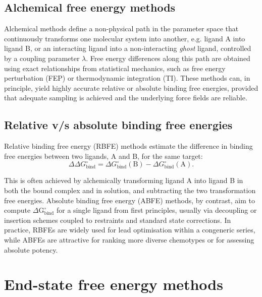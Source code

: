 \documentclass[12pt]{article}
\begin{document}
\subsection{Alchemical free energy methods}

Alchemical methods define a non-physical path in the parameter space that continuously transforms one molecular system into another, e.g. ligand A into ligand B, or an interacting ligand into a non-interacting \emph{ghost} ligand, controlled by a coupling parameter $\lambda$\cite{CH10_chipot2007free,CH10_choderamobley2011perspective}. Free energy differences along this path are obtained using exact relationships from statistical mechanics, such as free energy perturbation (FEP) or thermodynamic integration (TI). These methods can, in principle, yield highly accurate relative or absolute binding free energies, provided that adequate sampling is achieved and the underlying force fields are reliable. 

\subsection{Relative v/s absolute binding free energies}

Relative binding free energy (RBFE) methods estimate the difference in binding free energies between two ligands, A and B, for the same target:
\begin{equation}
\Delta\Delta G^\circ_\mathrm{bind} = \Delta G^\circ_\mathrm{bind}(\mathrm{B}) - \Delta G^\circ_\mathrm{bind}(\mathrm{A}). 
\end{equation}

This is often achieved by alchemically transforming ligand A into ligand B in both the bound complex and in solution, and subtracting the two transformation free energies. Absolute binding free energy (ABFE) methods, by contrast, aim to compute $\Delta \textrm{G}^\circ_\textrm{bind}$ for a single ligand from first principles, usually via decoupling or insertion schemes coupled to restraints and standard state corrections\cite{CH10_gilson1997calculation,CH10_deng2009abfe,CH10_choderamobley2011perspective}. In practice, RBFEs are widely used for lead optimisation within a congeneric series, while ABFEs are attractive for ranking more diverse chemotypes or for assessing absolute potency. 

\section{End-state free energy methods}
\end{document}

